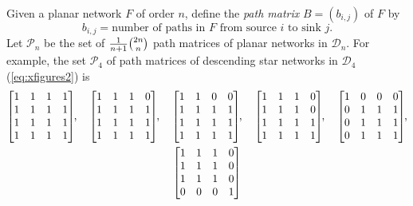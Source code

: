 \documentclass[12pt]{amsart}
\theoremstyle{definition}
\numberwithin{equation}{section}
\newcommand{\ntksp}{\negthickspace}
\begin{document}
Given a planar network $F$ of order $n$, define the {\em path matrix}
$B = (b_{i,j})$ of $F$
by
\begin{equation}\label{eq:pathmatrixdef}
  b_{i,j} = \text{number of paths in $F$ from source $i$ to sink $j$}.
\end{equation}
Let $\mathcal P_n$ be the set of $\tfrac 1{n+1}\tbinom{2n}n$ path matrices of
planar networks in $\mathcal D_n$.
For example, the set $\mathcal P_4$ of path matrices of
descending star networks in $\mathcal D_4$
(\ref{eq:xfigures2}) is
\begin{equation}\label{eq:14pathmatrices}
  \begin{gathered}
  \begin{bmatrix}
    1 & 1 & 1 & 1\\
    1 & 1 & 1 & 1\\
    1 & 1 & 1 & 1\\
    1 & 1 & 1 & 1
  \end{bmatrix}\ntksp,
  \quad
  \begin{bmatrix}
    1 & 1 & 1 & 0\\
    1 & 1 & 1 & 1\\
    1 & 1 & 1 & 1\\
    1 & 1 & 1 & 1
  \end{bmatrix}\ntksp,
  \quad
  \begin{bmatrix}
    1 & 1 & 0 & 0\\
    1 & 1 & 1 & 1\\
    1 & 1 & 1 & 1\\
    1 & 1 & 1 & 1
  \end{bmatrix}\ntksp,
  \quad
  \begin{bmatrix}
    1 & 1 & 1 & 0\\
    1 & 1 & 1 & 0\\
    1 & 1 & 1 & 1\\
    1 & 1 & 1 & 1
  \end{bmatrix}\ntksp,
  \quad
  \begin{bmatrix}
    1 & 0 & 0 & 0\\
    0 & 1 & 1 & 1\\
    0 & 1 & 1 & 1\\
    0 & 1 & 1 & 1
  \end{bmatrix}\ntksp,
  \\
  \begin{bmatrix}
    1 & 1 & 1 & 0\\
    1 & 1 & 1 & 0\\
    1 & 1 & 1 & 0\\
    0 & 0 & 0 & 1

\end{bmatrix}
\end{gathered}
\end{equation}
\end{document}
